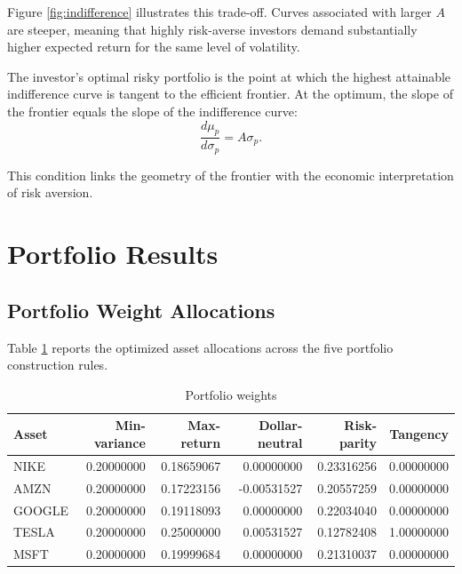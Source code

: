 \documentclass[wcp]{jmlr}
\begin{document}
\begin{abstract - TEST}
Figure \ref{fig:indifference} illustrates this trade-off. Curves associated with larger $A$ are steeper, meaning that highly risk-averse investors demand substantially higher expected return for the same level of volatility.

The investor’s optimal risky portfolio is the point at which the highest attainable indifference curve is tangent to the efficient frontier. At the optimum, the slope of the frontier equals the slope of the indifference curve:
\begin{equation}
\frac{d\mu_p}{d\sigma_p} = A\sigma_p.
\end{equation}

This condition links the geometry of the frontier with the economic interpretation of risk aversion.

\section{Portfolio Results}

\subsection{Portfolio Weight Allocations}

Table \ref{tab:weights} reports the optimized asset allocations across the five portfolio construction rules.

\begin{table}[H]
\centering
\caption{Portfolio weights}
\label{tab:weights}
\small
\begin{tabular}{lrrrrr}
\toprule
Asset & Min-variance & Max-return & Dollar-neutral & Risk-parity & Tangency \\
\midrule
NIKE   & 0.20000000 & 0.18659067 &  0.00000000 & 0.23316256 & 0.00000000 \\
AMZN   & 0.20000000 & 0.17223156 & -0.00531527 & 0.20557259 & 0.00000000 \\
GOOGLE & 0.20000000 & 0.19118093 &  0.00000000 & 0.22034040 & 0.00000000 \\
TESLA  & 0.20000000 & 0.25000000 &  0.00531527 & 0.12782408 & 1.00000000 \\
MSFT   & 0.20000000 & 0.19999684 &  0.00000000 & 0.21310037 & 0.00000000 \\
\bottomrule
\end{tabular}
\end{table}


\end{abstract - TEST}
\end{document}
